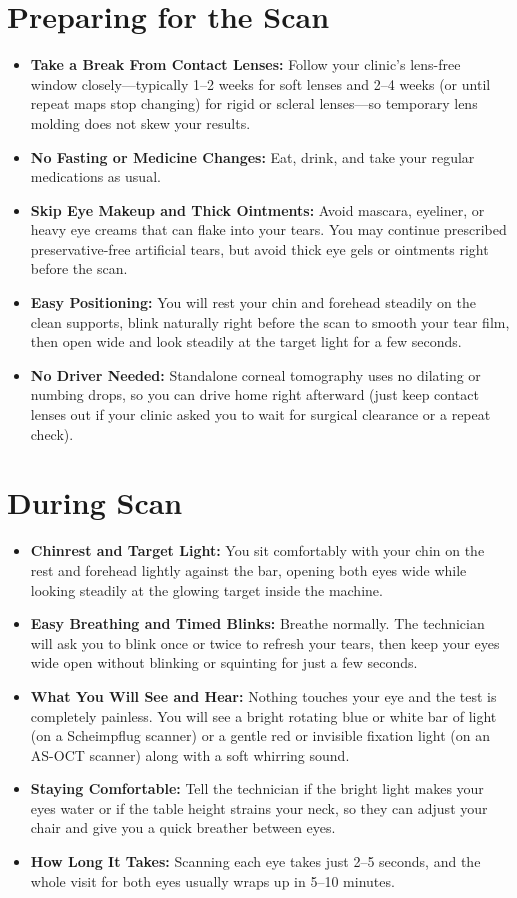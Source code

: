 \section{Preparing for the Scan}
\begin{itemize}
    \item \textbf{Take a Break From Contact Lenses:} Follow your clinic's lens-free window closely---typically 1--2 weeks for soft lenses and 2--4 weeks (or until repeat maps stop changing) for rigid or scleral lenses---so temporary lens molding does not skew your results.
    \item \textbf{No Fasting or Medicine Changes:} Eat, drink, and take your regular medications as usual.
    \item \textbf{Skip Eye Makeup and Thick Ointments:} Avoid mascara, eyeliner, or heavy eye creams that can flake into your tears. You may continue prescribed preservative-free artificial tears, but avoid thick eye gels or ointments right before the scan.
    \item \textbf{Easy Positioning:} You will rest your chin and forehead steadily on the clean supports, blink naturally right before the scan to smooth your tear film, then open wide and look steadily at the target light for a few seconds.
    \item \textbf{No Driver Needed:} Standalone corneal tomography uses no dilating or numbing drops, so you can drive home right afterward (just keep contact lenses out if your clinic asked you to wait for surgical clearance or a repeat check).
\end{itemize}

\section{During Scan}
\begin{itemize}
    \item \textbf{Chinrest and Target Light:} You sit comfortably with your chin on the rest and forehead lightly against the bar, opening both eyes wide while looking steadily at the glowing target inside the machine.
    \item \textbf{Easy Breathing and Timed Blinks:} Breathe normally. The technician will ask you to blink once or twice to refresh your tears, then keep your eyes wide open without blinking or squinting for just a few seconds.
    \item \textbf{What You Will See and Hear:} Nothing touches your eye and the test is completely painless. You will see a bright rotating blue or white bar of light (on a Scheimpflug scanner) or a gentle red or invisible fixation light (on an AS-OCT scanner) along with a soft whirring sound.
    \item \textbf{Staying Comfortable:} Tell the technician if the bright light makes your eyes water or if the table height strains your neck, so they can adjust your chair and give you a quick breather between eyes.
    \item \textbf{How Long It Takes:} Scanning each eye takes just 2--5 seconds, and the whole visit for both eyes usually wraps up in 5--10 minutes.
\end{itemize}

